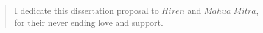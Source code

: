 \vspace*{\fill}
\vspace*{-2in}
\begin{quote}
    \center
    I dedicate this dissertation proposal to $Hiren$ and $Mahua\;Mitra$, \\
    for their never ending love and support.
\end{quote}
\vspace*{\fill}
